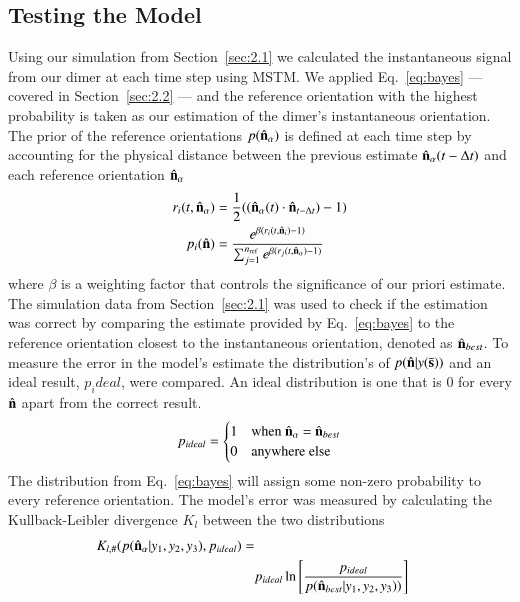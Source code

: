 \documentclass[final, 3p]{elsarticle}
\begin{document}
\subsection{Testing the Model}
\label{sec:2.3}


Using our simulation from Section~\ref{sec:2.1} we calculated the
instantaneous signal from our dimer at each time step using MSTM.  We
applied Eq.~\eqref{eq:bayes} --- covered in Section~\ref{sec:2.2} ---
and the reference orientation with the highest probability is taken as
our estimation of the dimer's instantaneous orientation.  The prior of
the reference orientations $p(\hat{\bf n}_\alpha)$ is defined at each
time step by accounting for the physical distance between the previous
estimate $\hat{\bf n}_{\alpha}(t - \Delta t)$ and each reference
orientation $\hat{\bf n}_\alpha$
\begin{align}
  r_i(t, \hat{\bf n}_\alpha)
  &= \frac{1}{2}((\hat{\bf n}_{\alpha}(t) \cdot \hat{\bf n}_{t-\Delta t})-1)
  \\
  p_i(\hat{\bf n})
  &= \frac{e^{\beta (r_i(t,\hat{\bf n}_i)-1)}}
{\sum_{j=1}^{n_{\rm ref}}e^{\beta(r_j(t, \hat{\bf n}_\alpha)-1)}}
\end{align}
where $\beta$ is a weighting factor that controls the significance of
our priori estimate.  The simulation data from Section~\ref{sec:2.1}
was used to check if the estimation was correct by comparing the
estimate provided by Eq.~\eqref{eq:bayes} to the reference orientation
closest to the instantaneous orientation, denoted as
$\hat{\bf n}_{best}$.  To measure the error in the model's estimate
the distribution's of $p(\hat{\bf n}| y(\bar{\bf s}))$ and an
ideal result, $p_ideal$, were compared.  An ideal distribution is one
that is 0 for every $\hat{\bf n}$ apart from the correct result.
\begin{align}
p_{ideal} = 
\begin{cases}
	1 & \text{when $\hat{\bf n}_\alpha$ = $\hat{\bf n}_{best}$}\\
	0 & \text{anywhere else}
\end{cases}
\end{align}
The distribution from Eq.~\eqref{eq:bayes} will assign some non-zero
probability to every reference orientation.  The model's error was
measured by calculating the Kullback-Leibler divergence $K_l$ between
the two distributions
\begin{align}
  K_{l, \#}(p(\hat{\bf n}_\alpha| y_1, y_2, y_3), p_{ideal})
  =\nonumber
  \\
&p_{ideal}\ln \left[\frac{p_{ideal}}{p(\hat{\bf n}_{best}| y_1,y_2,y_3))}
\right]
\end{align}
\end{document}
